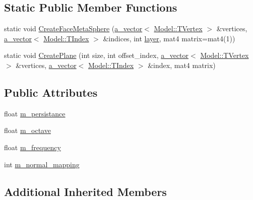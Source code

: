 \subsection*{Static Public Member Functions}
\begin{DoxyCompactItemize}
\item 
static void \hyperlink{class_planet_model_aaa6a3e138bde8c6bcf5da9e7d17cf463}{Create\+Face\+Meta\+Sphere} (\hyperlink{_vector_8h_a3df82cea60ff4ad0acb44e58454406a5}{a\+\_\+vector}$<$ \hyperlink{struct_agmd_1_1_model_1_1_t_vertex}{Model\+::\+T\+Vertex} $>$ \&vertices, \hyperlink{_vector_8h_a3df82cea60ff4ad0acb44e58454406a5}{a\+\_\+vector}$<$ \hyperlink{class_agmd_1_1_model_aca4a6ee5402b386a0b9d0aea52c71eaa}{Model\+::\+T\+Index} $>$ \&indices, int \hyperlink{_examples_2_planet_2_app_8cpp_a821f9e41ad80528dd35e9a982db1b22a}{layer}, mat4 matrix=mat4(1))
\item 
static void \hyperlink{class_planet_model_a3a26a59fe70e2ffecbb3d5f8f8ee26ac}{Create\+Plane} (int size, int offset\+\_\+index, \hyperlink{_vector_8h_a3df82cea60ff4ad0acb44e58454406a5}{a\+\_\+vector}$<$ \hyperlink{struct_agmd_1_1_model_1_1_t_vertex}{Model\+::\+T\+Vertex} $>$ \&vertices, \hyperlink{_vector_8h_a3df82cea60ff4ad0acb44e58454406a5}{a\+\_\+vector}$<$ \hyperlink{class_agmd_1_1_model_aca4a6ee5402b386a0b9d0aea52c71eaa}{Model\+::\+T\+Index} $>$ \&index, mat4 matrix)
\end{DoxyCompactItemize}
\subsection*{Public Attributes}
\begin{DoxyCompactItemize}
\item 
float \hyperlink{class_planet_model_a89ed4daf68550bcbfe414ee96379649b}{m\+\_\+persistance}
\item 
float \hyperlink{class_planet_model_a5af782ac76afb9b21346effc0fda0bde}{m\+\_\+octave}
\item 
float \hyperlink{class_planet_model_a3a085d9ea92c44a1404b06fa8a368176}{m\+\_\+frequency}
\item 
int \hyperlink{class_planet_model_a9aab0eb4b59ba73d9b13104526e64b74}{m\+\_\+normal\+\_\+mapping}
\end{DoxyCompactItemize}
\subsection*{Additional Inherited Members}


